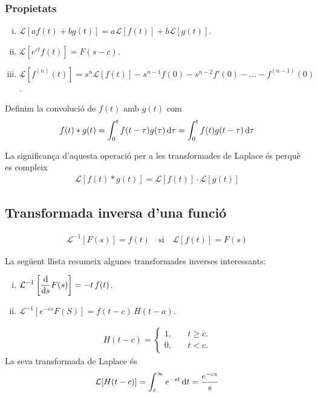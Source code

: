 \subsubsection*{Propietats}
\begin{enumerate}[i)]
    \item $\mathcal{L}\left[a f(t) + b g(t) \right] = a \mathcal{L}[f(t)] + b \mathcal{L}[g(t)]$.
    \item $\mathcal{L}\left[ e^{ct} f(t) \right] = F(s - c)$.
    \item $\mathcal{L}\left[ f^{(n)}(t) \right] = s^{n} \mathcal{L}\left[f(t)\right] - s^{n-1} f(0) - s^{n-2} f'(0) - \dots - f^{(n-1)}(0)$.
\end{enumerate}
\begin{defi}[Convolució]
    Definim la convolució de $f(t)$ amb $g(t)$ com
    \begin{align}
        f(t) \ast g(t) = \int_{0}^{t} f(t - \tau) g(\tau) \mathop{}\!\mathrm{d} \tau = \int_{0}^{t} f(t) g(t - \tau) \mathop{}\!\mathrm{d} \tau
    \end{align}
\end{defi}
La significança d'aquesta operació per a les transformades de Laplace és perquè es compleix
\begin{align}
    \mathcal{L}\left[ f(t) \ast g(t) \right] = \mathcal{L}\left[ f(t) \right] \cdot \mathcal{L}\left[ g(t) \right]
\end{align}

\subsection{Transformada inversa d'una funció}
\begin{defi}
    \begin{align}
        \mathcal{L}^{-1} \left[ F(s) \right] = f(t) \quad \text{si} \quad \mathcal{L} \left[ f(t) \right] = F(s)
    \end{align}
\end{defi}
La següent llista resumeix algunes transformades inverses interessants:
\begin{enumerate}[i)]
    \item $\displaystyle \mathcal{L}^{-1}\left[ \frac{\mathrm{d}}{ \mathrm{d} s} F(s) \right] = -t \, f(t)$.
    \item $\mathcal{L}^{-1}\left[ e^{-cs} F(S) \right] = f(t-c) \,H(t-a)$.
\end{enumerate}
\begin{defi}
    \begin{align}
        H(t-c) = \begin{cases} 1, & \quad t \geq c. \\ 0, & \quad t < c. \end{cases}
    \end{align}
    La seva transformada de Laplace és
    \begin{align*}
        \mathcal{L}[H(t-c)] = \int_{c}^{\infty} e^{-st} \mathop{}\!\mathrm{d} t = \frac{e^{-cs}}{s}
    \end{align*}
\end{defi}

